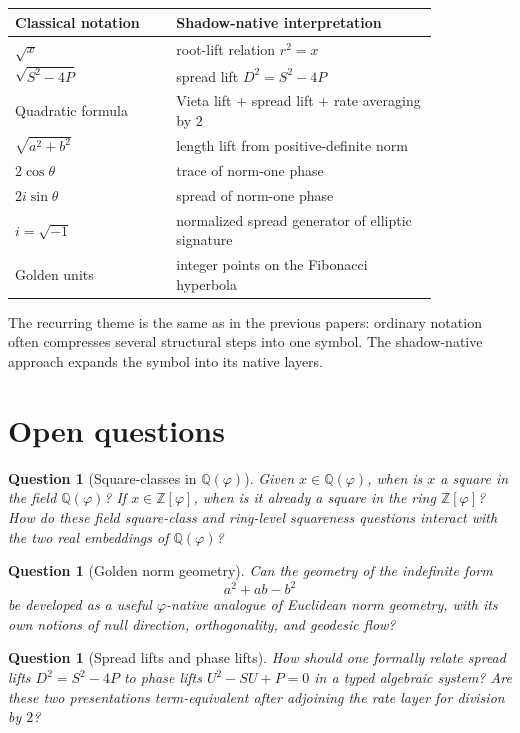 \documentclass[11pt]{article}
\newtheorem{question}[definition]{Question}
\newcommand{\ph}{\varphi}
\newcommand{\Z}{\mathbb{Z}}
\newcommand{\Q}{\mathbb{Q}}
\begin{document}
\begin{center}
\begin{tabular}{p{0.32\linewidth}p{0.52\linewidth}}
\toprule
Classical notation & Shadow-native interpretation \\
\midrule
$\sqrt{x}$ & root-lift relation $r^2=x$ \\
$\sqrt{S^2-4P}$ & spread lift $D^2=S^2-4P$ \\
Quadratic formula & Vieta lift + spread lift + rate averaging by $2$ \\
$\sqrt{a^2+b^2}$ & length lift from positive-definite norm \\
$2\cos\theta$ & trace of norm-one phase \\
$2i\sin\theta$ & spread of norm-one phase \\
$i=\sqrt{-1}$ & normalized spread generator of elliptic signature \\
Golden units & integer points on the Fibonacci hyperbola \\
\bottomrule
\end{tabular}
\end{center}

The recurring theme is the same as in the previous papers: ordinary notation often compresses several structural steps into one symbol.  The shadow-native approach expands the symbol into its native layers.

\section{Open questions}

\begin{question}[Square-classes in $\Q(\ph)$]
Given $x\in\Q(\ph)$, when is $x$ a square in the field $\Q(\ph)$?  If $x\in\Z[\ph]$, when is it already a square in the ring $\Z[\ph]$?  How do these field square-class and ring-level squareness questions interact with the two real embeddings of $\Q(\ph)$?
\end{question}

\begin{question}[Golden norm geometry]
Can the geometry of the indefinite form
\[
    a^2+ab-b^2
\]
be developed as a useful $\ph$-native analogue of Euclidean norm geometry, with its own notions of null direction, orthogonality, and geodesic flow?
\end{question}

\begin{question}[Spread lifts and phase lifts]
How should one formally relate spread lifts $D^2=S^2-4P$ to phase lifts $U^2-SU+P=0$ in a typed algebraic system?  Are these two presentations term-equivalent after adjoining the rate layer for division by $2$?
\end{question}
\end{document}
